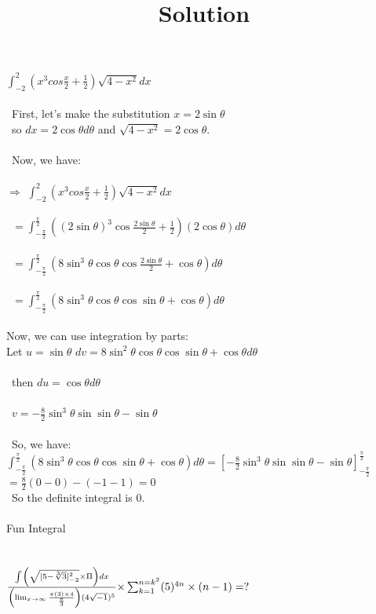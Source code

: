 \documentclass{article}
\title{Solution}
\begin{document}
    $\int_{-2}^{2}\left( x^{3}cos\frac{x}{2}+\frac{1}{2} \right)\sqrt{4-x^{2}}dx$\\\\\
First, let's make the substitution $x = 2\sin{\theta}$\\\ 
so $dx =2\cos{\theta}d\theta$ and $\sqrt{4-x^2} = 2\cos{\theta}$.\\\\\
Now, we have:\\\\
$\Longrightarrow$ 
$\int_{-2}^{2}\left( x^{3}cos\frac{x}{2}+\frac{1}{2} \right)\sqrt{4-x^{2}}dx$  \\\\\ 
$= \int_{-\frac{\pi}{2}}^{\frac{\pi}{2}}\left( (2\sin{\theta})^{3}\cos\frac{2\sin{\theta}}{2}+\frac{1}{2} \right)(2\cos{\theta})d\theta$ \\\\\ 
$=\int_{-\frac{\pi}{2}}^{\frac{\pi}{2}}\left( 8\sin^{3}{\theta}\cos{\theta}\cos\frac{2\sin{\theta}}{2}+\cos{\theta} \right)d\theta$\\\\\ 
$=\int_{-\frac{\pi}{2}}^{\frac{\pi}{2}}\left( 8\sin^{3}{\theta}\cos{\theta}\cos\sin{\theta}+\cos{\theta} \right)d\theta$\\\\
Now, we can use integration by parts:\\
Let $u = \sin{\theta}$
$dv = 8\sin^{2}{\theta}\cos{\theta}\cos\sin{\theta} + \cos{\theta}d\theta$\\\\\ 
then $du = \cos{\theta}d\theta$\\\\\ 
$v = -\frac{8}{2}\sin^{3}{\theta}\sin\sin{\theta} - \sin{\theta}$\\\\\ 
So, we have:
$\int_{-\frac{\pi}{2}}^{\frac{\pi}{2}}\left( 8\sin^{3}{\theta}\cos{\theta}\cos\sin{\theta}+\cos{\theta} \right)d\theta = [-\frac{8}{2}\sin^{3}{\theta}\sin\sin{\theta} - \sin{\theta}]_{-\frac{\pi}{2}}^{\frac{\pi}{2}}$
$=\frac{8}{2}(0-0) - (-1-1) = 0$\\\
So the definite integral is 0.\\\\

Fun Integral\\\\\\
$\frac{\int_{}^{} \left(\sqrt{[5-\sqrt[3]{3}]^{2}_{-2}}\times  \Pi \right)dx}
{\left( \lim_{x \to \infty}\frac{\pi(3) \space \times\space 4}{\frac{\pi}{3}} \right)(4\sqrt{-1})^{5}}\space{\times }\sum_{k=1}^{n=k^{2}} (5)^{4n}\times (n-1)=?$
\end{document}

